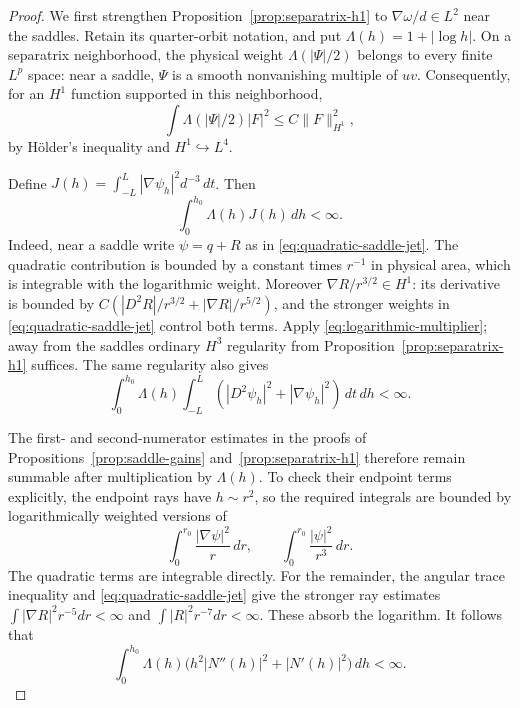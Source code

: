 \documentclass[reqno,11pt]{amsart}
\numberwithin{equation}{section}
\theoremstyle{remark}
\begin{document}
\begin{proof}
We first strengthen Proposition~\ref{prop:separatrix-h1} to
$\nabla\omega/d\in L^2$ near the saddles.  Retain its quarter-orbit
notation, and put $\Lambda(h)=1+|\log h|$.  On a separatrix
neighborhood, the physical weight $\Lambda(|\Psi|/2)$ belongs to
every finite $L^p$ space: near a saddle, $\Psi$ is a smooth
nonvanishing multiple of $uv$.  Consequently, for an $H^1$
function supported in this neighborhood,
\begin{equation}
 \int\Lambda(|\Psi|/2)|F|^2\leq C\|F\|_{H^1}^2,
 \label{eq:logarithmic-multiplier}
\end{equation}
by H\"older's inequality and $H^1\hookrightarrow L^4$.

Define $J(h)=\int_{-L}^L|\nabla\psi_h|^2d^{-3}\,dt$.
Then
\begin{equation}
 \int_0^{h_0}\Lambda(h)J(h)\,dh<\infty.
 \label{eq:logarithmic-subcritical-energy}
\end{equation}
Indeed, near a saddle write $\psi=q+R$ as in
\eqref{eq:quadratic-saddle-jet}.  The quadratic contribution is
bounded by a constant times $r^{-1}$ in physical area, which is
integrable with the logarithmic weight.  Moreover
$\nabla R/r^{3/2}\in H^1$: its derivative is bounded by
$C(|D^2R|/r^{3/2}+|\nabla R|/r^{5/2})$, and the stronger
weights in \eqref{eq:quadratic-saddle-jet} control both terms.
Apply \eqref{eq:logarithmic-multiplier}; away from the saddles
ordinary $H^3$ regularity from Proposition~\ref{prop:separatrix-h1}
suffices.  The same regularity also gives
\[
 \int_0^{h_0}\Lambda(h)\int_{-L}^L
       (|D^2\psi_h|^2+|\nabla\psi_h|^2)\,dt\,dh<\infty.
\]

The first- and second-numerator estimates in the proofs of
Propositions~\ref{prop:saddle-gains} and~\ref{prop:separatrix-h1} therefore remain summable after multiplication by
$\Lambda(h)$.  To check their endpoint terms explicitly, the
endpoint rays have $h\sim r^2$, so the required integrals are
bounded by logarithmically weighted versions of
\[
 \int_0^{r_0}\frac{|\nabla\psi|^2}{r}\,dr,
 \qquad
 \int_0^{r_0}\frac{|\psi|^2}{r^3}\,dr.
\]
The quadratic terms are integrable directly.  For the remainder,
the angular trace inequality and
\eqref{eq:quadratic-saddle-jet} give the stronger ray estimates
$\int|\nabla R|^2r^{-5}dr<\infty$ and
$\int|R|^2r^{-7}dr<\infty$.  These absorb the logarithm.
It follows that
\begin{equation}
 \int_0^{h_0}\Lambda(h)
       \big(h^2|N''(h)|^2+|N'(h)|^2\big)\,dh<\infty.
 \label{eq:logarithmic-numerator}
\end{equation}


\end{proof}
\end{document}
